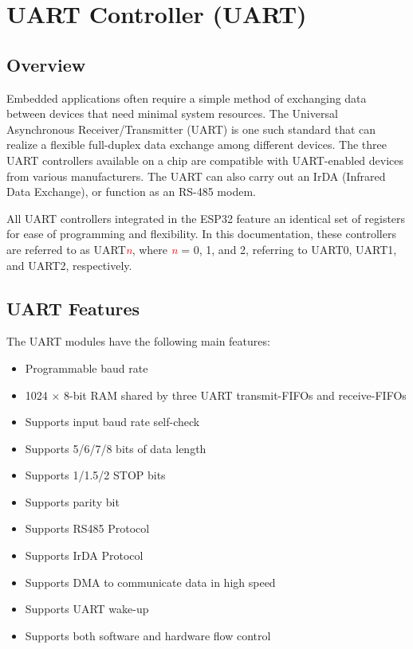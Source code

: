 \documentclass[main\_\_EN.tex]{subfiles}
\begin{document}
\setenglishformatting

\ifglobal
\else
    \listoftodos
    {\let\clearpage\relax \listofdonetodos}
    \tableofcontents
\fi



\hypertarget{uart}{}
\chapter{UART Controller (UART)}
\label{mod:uart}

\section{Overview}
Embedded applications often require a simple method of exchanging data between devices that need minimal system resources. The Universal Asynchronous Receiver/Transmitter (UART) is one such standard that can realize a flexible full-duplex data exchange among different devices. The three UART controllers available on a chip are compatible with UART-enabled devices from various manufacturers. The UART can also carry out an IrDA (Infrared Data Exchange), or function as an RS-485 modem.

All UART controllers integrated in the ESP32 feature an identical set of registers for ease of programming and flexibility. In this documentation, these controllers are referred to as UART\textcolor{red}{\it{n}}, where \textcolor{red}{\it{n}} = 0, 1, and 2, referring to UART0, UART1, and UART2, respectively.

\section{UART Features}

The UART modules have the following main features:

\begin{itemize}
    \item Programmable baud rate
    \item 1024 × 8-bit RAM shared by three UART transmit-FIFOs and receive-FIFOs
    \item Supports input baud rate self-check
    \item Supports 5/6/7/8 bits of data length
    \item Supports 1/1.5/2 STOP bits
    \item Supports parity bit
    \item Supports RS485 Protocol
    \item Supports IrDA Protocol
    \item Supports DMA to communicate data in high speed
    \item Supports UART wake-up
    \item Supports both software and hardware flow control
\end{itemize}
\end{document}
